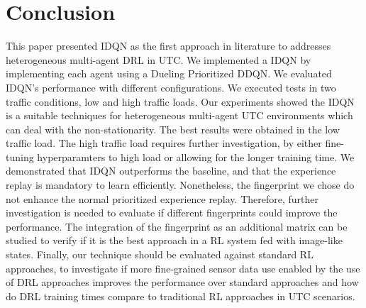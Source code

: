 \documentclass{llncs}
\begin{document}
\section{Conclusion}

This paper presented IDQN as the first approach in literature to addresses heterogeneous multi-agent DRL in UTC. We implemented a IDQN by implementing each agent using a Dueling Prioritized DDQN. We evaluated IDQN's performance with different configurations. We executed tests in two traffic conditions, low and high traffic loads. Our experiments showed the IDQN is a suitable techniques for heterogeneous multi-agent UTC environments which can deal with the non-stationarity. The best results were obtained in the low traffic load. The high traffic load requires further investigation, by either fine-tuning hyperparamters to high load or allowing for the longer training time. We demonstrated that IDQN outperforms the baseline, and that the experience replay is mandatory to learn efficiently. Nonetheless, the fingerprint we chose do not enhance the normal prioritized experience replay. Therefore, further investigation is needed to evaluate if different fingerprints could improve the performance. The integration of the fingerprint as an additional matrix can be studied to verify if it is the best approach in a RL system fed with image-like states. Finally, our technique should be evaluated against standard RL approaches, to investigate if more fine-grained sensor data use enabled by the use of DRL approaches improves the performance over standard approaches and how do DRL training times compare to traditional RL approaches in UTC scenarios. 



 
\end{document}
